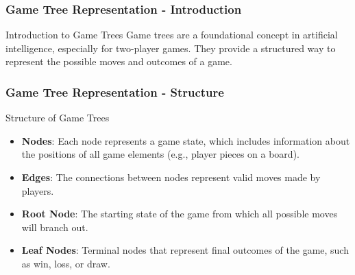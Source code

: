 \documentclass[aspectratio=169]{beamer}
\begin{document}
\begin{frame}[fragile]
    \frametitle{Game Tree Representation - Introduction}
    \begin{block}{Introduction to Game Trees}
        Game trees are a foundational concept in artificial intelligence, especially for two-player games. They provide a structured way to represent the possible moves and outcomes of a game.
    \end{block}
\end{frame}

\begin{frame}[fragile]
    \frametitle{Game Tree Representation - Structure}
    \begin{block}{Structure of Game Trees}
        \begin{itemize}
            \item \textbf{Nodes}: Each node represents a game state, which includes information about the positions of all game elements (e.g., player pieces on a board).
            \item \textbf{Edges}: The connections between nodes represent valid moves made by players.
            \item \textbf{Root Node}: The starting state of the game from which all possible moves will branch out.
            \item \textbf{Leaf Nodes}: Terminal nodes that represent final outcomes of the game, such as win, loss, or draw.
        \end{itemize}
    \end{block}
\end{frame}
\end{document}
